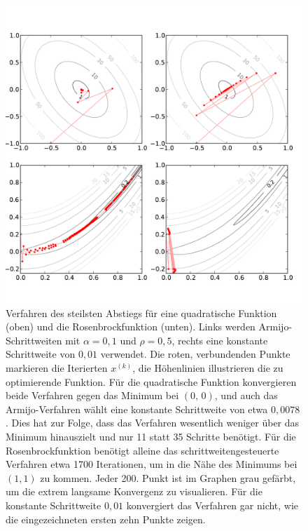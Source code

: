 \begin{figure}
  \centering
  \includegraphics[width=\textwidth]{plots/steepestdescent}
  \caption{Verfahren des steilsten Abstiegs für eine quadratische
    Funktion (oben) und die Rosenbrockfunktion (unten). Links werden
    Armijo-Schrittweiten mit $\alpha=0,1$ und $\rho=0,5$, rechts eine
    konstante Schrittweite von $0,01$ verwendet. Die roten,
    verbundenden Punkte markieren die Iterierten $x^{(k)}$, die
    Höhenlinien illustrieren die zu optimierende Funktion. Für die
    quadratische Funktion konvergieren beide Verfahren gegen das
    Minimum bei $(0,\,0)$, und auch das Armijo-Verfahren wählt eine
    konstante Schrittweite von etwa $0,0078$. Dies hat zur Folge, dass
    das Verfahren wesentlich weniger über das Minimum hinauszielt und
    nur 11 statt 35 Schritte benötigt. Für die Rosenbrockfunktion
    benötigt alleine das schrittweitengesteuerte Verfahren etwa 1700
    Iterationen, um in die Nähe des Minimums bei $(1,1)$ zu kommen.  Jeder
    200. Punkt ist im Graphen grau gefärbt, um die extrem langsame
    Konvergenz zu visualieren. Für die konstante Schrittweite $0,01$
    konvergiert das Verfahren gar nicht, wie die
    eingezeichneten ersten zehn Punkte zeigen.} \label{fig:armijo}
\end{figure}

